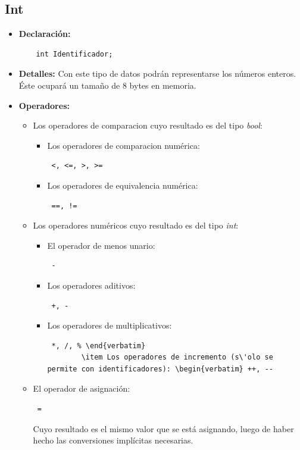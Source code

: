 \documentclass[11pt, spanish]{report}
\begin{document}
\subsection{Int}
\begin{itemize}
\item \textbf{Declaraci\'on:}
  \begin{verbatim}
    int Identificador;
  \end{verbatim}
\item \textbf{Detalles:}
  Con este tipo de datos podr\'an representarse los n\'umeros enteros. \'Este ocupar\'a un tama\~no de 8 bytes en memoria.\\
\item \textbf{Operadores:}
  \begin{itemize}
    \item Los operadores de comparacion cuyo resultado es del tipo \emph{bool}: 
      \begin{itemize}
      \item Los operadores de comparacion num\'erica: \begin{verbatim} <, <=, >, >= \end{verbatim}
      \item Los operadores de equivalencia num\'erica: \begin{verbatim} ==, != \end{verbatim}
      \end{itemize}
    \item Los operadores num\'ericos cuyo resultado es del tipo \emph{int}:
      \begin{itemize}
        \item El operador de menos unario: \begin{verbatim} - \end{verbatim}
        \item Los operadores aditivos: \begin{verbatim} +, - \end{verbatim}
        \item Los operadores de multiplicativos: \begin{verbatim} *, /, % \end{verbatim}
        \item Los operadores de incremento (s\'olo se permite con identificadores): \begin{verbatim} ++, -- \end{verbatim}
      \end{itemize}
    \item El operador de asignaci\'on:
        \begin{verbatim} = \end{verbatim}
        Cuyo resultado es el mismo valor que se est\'a asignando, luego de haber hecho las conversiones impl\'icitas necesarias.
  \end{itemize}
\end{itemize}
\end{document}
